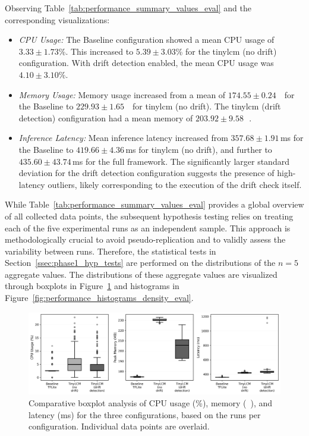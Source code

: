 Observing Table~\ref{tab:performance_summary_values_eval} and the corresponding visualizations:
\begin{itemize}[noitemsep, topsep=0pt]
    \item \textit{CPU Usage:} The Baseline configuration showed a mean CPU usage of $3.33 \pm 1.73$\%. This increased to $5.39 \pm 3.03$\% for the \gls{tinylcm} (no drift) configuration. With drift detection enabled, the mean CPU usage was $4.10 \pm 3.10$\%.
    \item \textit{Memory Usage:} Memory usage increased from a mean of $174.55 \pm 0.24$\,\si{\mega\byte} for the Baseline to $229.93 \pm 1.65$\,\si{\mega\byte} for \gls{tinylcm} (no drift). The \gls{tinylcm} (drift detection) configuration had a mean memory of $203.92 \pm 9.58$\,\si{\mega\byte}.
    \item \textit{Inference Latency:} Mean inference latency increased from $357.68 \pm 1.91$\,\si{\milli\second} for the Baseline to $419.66 \pm 4.36$\,\si{\milli\second} for \gls{tinylcm} (no drift), and further to $435.60 \pm 43.74$\,\si{\milli\second} for the full framework. The significantly larger standard deviation for the drift detection configuration suggests the presence of high-latency outliers, likely corresponding to the execution of the drift check itself.
\end{itemize}

While Table~\ref{tab:performance_summary_values_eval} provides a global overview of all collected data points, the subsequent hypothesis testing relies on treating each of the five experimental runs as an independent sample. This approach is methodologically crucial to avoid pseudo-replication and to validly assess the variability between runs. Therefore, the statistical tests in Section~\ref{ssec:phase1_hyp_tests} are performed on the distributions of the $n=5$ aggregate values. The distributions of these aggregate values are visualized through boxplots in Figure~\ref{fig:performance_boxplots_eval} and histograms in Figure~\ref{fig:performance_histograms_density_eval}.

\begin{figure}[htbp]
  \centering
  \includegraphics[width=.98\linewidth]{figs/evaluation/boxplots_N5.png}
  \caption[Boxplot Analysis of Aggregated Performance Metrics]{Comparative boxplot analysis of CPU usage (\%), memory (\si{\mega\byte}), and latency (\si{\milli\second}) for the three configurations, based on the runs per configuration. Individual data points are overlaid.}
  \label{fig:performance_boxplots_eval}
\end{figure}

